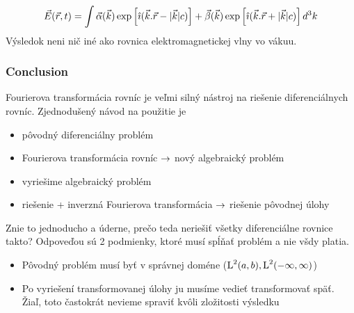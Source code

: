 \begin{equation}
 \vec{E}{(\vec{r},t)} = \int \vec{\alpha}(\vec{k}) \exp \left[\hat{\imath}(
 \vec{k}.\vec{r} - |\vec{k}| c) \right] +
 \vec{\beta}(\vec{k}) \exp \left[\hat{\imath}(
 \vec{k}.\vec{r} + |\vec{k}| c)\right] d^3k
\end{equation}
Výsledok neni nič iné ako rovnica elektromagnetickej vlny vo vákuu.

\subsubsection{Conclusion}
Fourierova transformácia rovníc je veľmi silný nástroj na riešenie
diferenciálnych rovníc. Zjednodušený návod na použitie je 
\begin{itemize}
\item pôvodný diferenciálny problém
\item Fourierova transformácia rovníc $\rightarrow$ nový algebraický
problém
\item vyriešime algebraický problém
\item riešenie + inverzná Fourierova transformácia $\rightarrow$ riešenie
pôvodnej úlohy
\end{itemize}

Znie to jednoducho a úderne, prečo teda neriešiť všetky diferenciálne
rovnice takto? Odpoveďou sú 2 podmienky, ktoré musí spĺňať problém a
nie všdy platia.
\begin{itemize}
\item Pôvodný problém musí byť v správnej doméne ($\mbox{L}^2(a,b),\mbox{L}^2(-\infty,\infty)$)
\item Po vyriešení transformovanej úlohy ju musíme vedieť
transformovať späť. Žiaľ, toto častokrát nevieme spraviť kvôli
zložitosti výsledku
\end{itemize}
